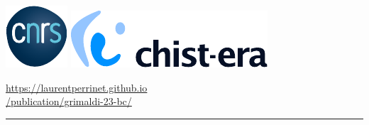 \documentclass[landscape,a0]{a0poster}
\begin{document}
%
\begin{minipage}[t]{0.175\textwidth}
%
\vspace{-9cm}
\includegraphics[height=.2\textwidth]{figures/cnrs_logo.pdf}\hspace{1cm} \includegraphics[height=.2\textwidth]{figures/chistera_logo.pdf}\hspace{1cm}
\vspace{.25cm}

\begin{center}
\color{blue}
\Large
\href{https://laurentperrinet.github.io/publication/grimaldi-23-bc/}{https://laurentperrinet.github.io
\\ /publication/grimaldi-23-bc/} \end{center}
\vspace{2cm}

\end{minipage}
%
\vspace*{-1.5cm}
\hrule
\vspace{5pt}
\end{document}
